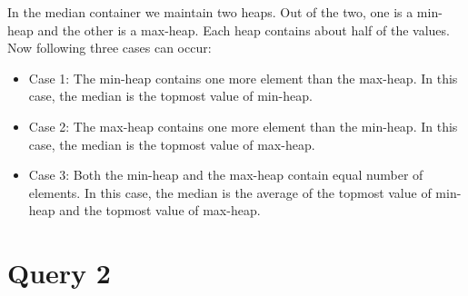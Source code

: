 In the median container we maintain two heaps. Out of the two, one is a min-heap and the other is a max-heap. Each heap contains about half of the values. Now following three cases can occur:
\begin{itemize}
\item Case 1: The min-heap contains one more element than the max-heap. In this case, the median is the topmost value of min-heap.
\item Case 2: The max-heap contains one more element than the min-heap. In this case, the median is the topmost value of max-heap.
\item Case 3: Both the min-heap and the max-heap contain equal number of elements. In this case, the median is the average of the topmost value of min-heap and the topmost value of max-heap.

\end{itemize}

\section{Query 2}

